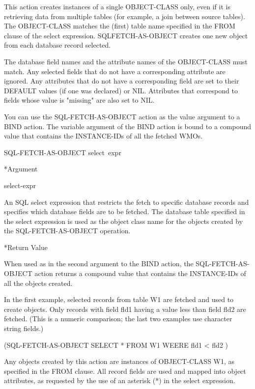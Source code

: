 {{This action creates instances of a single OBJECT-CLASS only,
even if it is retrieving data from multiple tables (for
example, a join between source tables). The OBJECT-CLASS
matches the (first) table name specified in the FROM clause
of the select expression. SQLFETCH-AS-OBJECT creates one new
object from each database record selected.

The database field names and the attribute names of the
OBJECT-CLASS must match. Any selected fields that do not have
a corresponding attribute are ignored. Any attributes that do
not have a corresponding field are set to their DEFAULT
values (if one was declared) or NIL. Attributes that
correspond to fields whose value is "missing" are also set to
NIL.

You can use the SQL-FETCH-AS-OBJECT action as the value
argument to a BIND action. The variable argument of the BIND
action is bound to a compound value that contains the
INSTANCE-IDs of all the fetched WMOs.



\Format

SQL-FETCH-AS-OBJECT select~expr



*Argument

select-expr

An SQL select expression that restricts the fetch to specific
database records and specifies which database fields are to
be fetched. The database table specified in the select
expression is used as the object class name for the objects
created by the SQL-FETCH-AS-OBJECT operation.



*Return Value

When used as in the second argument to the BIND action, the
SQL-FETCH-AS-OBJECT action returns a compound value that
contains the INSTANCE-IDs of all the objects created.



\Example

In the first example, selected records from table W1 are
fetched and used to create objects. Only records with field
fld1 having a value less than field fld2 are fetched. (This
is a numeric comparison; the last two examples use character
string fields.)



(SQL-FETCH-AS-OBJECT SELECT * FROM W1 WEERE fld1 < fld2 )



Any objects created by this action are instances of
OBJECT-CLASS W1, as specified in the FROM clause. All record
fields are used and mapped into object attributes, as
requested by the use of an asterisk (*) in the select
expression.



}}
